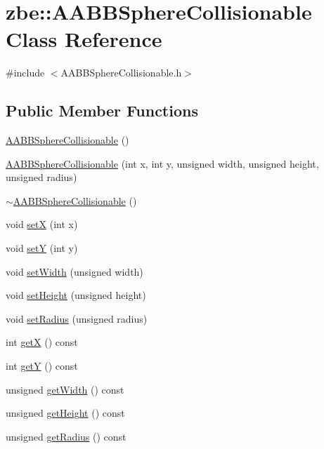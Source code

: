 \hypertarget{classzbe_1_1_a_a_b_b_sphere_collisionable}{}\section{zbe\+:\+:A\+A\+B\+B\+Sphere\+Collisionable Class Reference}
\label{classzbe_1_1_a_a_b_b_sphere_collisionable}


{\ttfamily \#include $<$A\+A\+B\+B\+Sphere\+Collisionable.\+h$>$}

\subsection*{Public Member Functions}
\begin{DoxyCompactItemize}
\item 
\hyperlink{classzbe_1_1_a_a_b_b_sphere_collisionable_a981bd06ba88c73b3cb905eea09d3c669}{A\+A\+B\+B\+Sphere\+Collisionable} ()
\item 
\hyperlink{classzbe_1_1_a_a_b_b_sphere_collisionable_a9dfd2b1b3db7ef47d5dafc3ec0c30d5a}{A\+A\+B\+B\+Sphere\+Collisionable} (int x, int y, unsigned width, unsigned height, unsigned radius)
\item 
\hyperlink{classzbe_1_1_a_a_b_b_sphere_collisionable_a63703824de5c12015f674e8e1b7cd01d}{$\sim$\+A\+A\+B\+B\+Sphere\+Collisionable} ()
\item 
void \hyperlink{classzbe_1_1_a_a_b_b_sphere_collisionable_a11d7e44875717dc713f00513a0d2ee9c}{set\+X} (int x)
\item 
void \hyperlink{classzbe_1_1_a_a_b_b_sphere_collisionable_a1a40956e0431b5ddb0763f8676e23465}{set\+Y} (int y)
\item 
void \hyperlink{classzbe_1_1_a_a_b_b_sphere_collisionable_a0f508e2f634c907d6dcbc5a3472fea54}{set\+Width} (unsigned width)
\item 
void \hyperlink{classzbe_1_1_a_a_b_b_sphere_collisionable_a996e8f134bd9ce3f22932cf5b010ec6d}{set\+Height} (unsigned height)
\item 
void \hyperlink{classzbe_1_1_a_a_b_b_sphere_collisionable_a5fb8c95e108ae3ecd5eb66f75a0ebb62}{set\+Radius} (unsigned radius)
\item 
int \hyperlink{classzbe_1_1_a_a_b_b_sphere_collisionable_abafe7ff2a79f52e41b7022a8fcda305f}{get\+X} () const 
\item 
int \hyperlink{classzbe_1_1_a_a_b_b_sphere_collisionable_a13c4e3749adba1048f36b4660a188da6}{get\+Y} () const 
\item 
unsigned \hyperlink{classzbe_1_1_a_a_b_b_sphere_collisionable_ad92f187845cfd459ee560a0a93fbbeea}{get\+Width} () const 
\item 
unsigned \hyperlink{classzbe_1_1_a_a_b_b_sphere_collisionable_ade399f9d6e9f1d5dd28bc8bd1c9b1be2}{get\+Height} () const 
\item 
unsigned \hyperlink{classzbe_1_1_a_a_b_b_sphere_collisionable_a5dc34b230c3f7fe312bb4e2bede3a38a}{get\+Radius} () const 
\end{DoxyCompactItemize}


